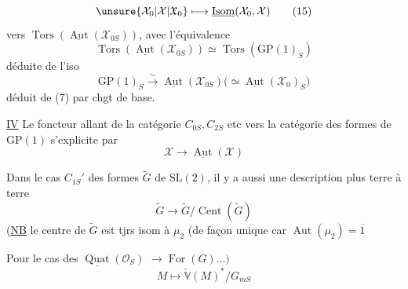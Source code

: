 \[
\unsure{\mathcal X_0|\mathcal X|\mathfrak X_0}\longmapsto\underline{\operatorname{Isom}}(\mathcal X_0,\mathcal X)\tag*{(15)}
\]
vers  $\operatorname{Tors}(\underline{\operatorname{Aut}}(\mathcal X_{0S}))$, avec l'équivalence
\[
\operatorname{Tors}(\underline{\operatorname{Aut}}(\mathcal X_{0S}))\simeq\operatorname{Tors}(\mathrm{GP}(1)_S)\tag*{(16)}
\]
déduite de l'iso 
\[
\mathrm{GP}(1)_S\xrightarrow{\sim}\underline{\operatorname{Aut}}(\mathcal X_{0S})\bigl(\simeq\underline{\operatorname{Aut}}(\mathcal X_0)_S\bigr)\tag*{(17)}
\]
déduit de (7) par chgt de base.


\uline{IV} Le foncteur allant de la catégorie   $C_{0S}, C_{2S}$ etc vers la catégorie  des formes de $\mathrm{GP}(1)$ s'explicite par
\[
\mathcal X\longrightarrow\underline{\operatorname{Aut}}(\mathcal X)\tag*{(18)}
\]

 Dans le cas  $C_{1S}'$ des formes $\widetilde G$ de $\mathrm{SL}(2)$, il y a aussi une description plus terre à terre
\[
\widetilde G\longrightarrow\widetilde G/\operatorname{Cent}(\widetilde G)\tag*{(19)}
\]
(\uline{NB} le centre de $\widetilde G$ est tjrs  isom à $\mu_2$ (de façon unique car $\operatorname{Aut}(\mu_2)=\overline1$

Pour le cas des $\underline{\operatorname{Quat}}(\mathcal O_S)$ $\to\operatorname{For}(G)\ldots)$
\[
M\longmapsto\check{\mathbb V}(M)^*/G_{mS}\tag*{(20)}
\]
